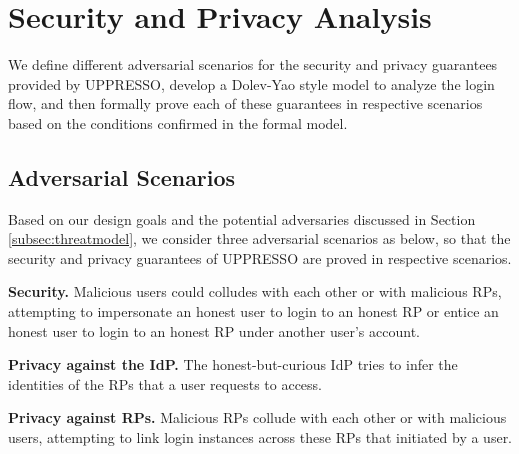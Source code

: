 \section{Security and Privacy Analysis}
\label{sec:analysis}
We define different adversarial scenarios for the security and privacy guarantees provided by UPPRESSO,
    develop a  Dolev-Yao style model to analyze the login flow,
    and then formally prove each of these guarantees in respective scenarios based on the conditions confirmed in the formal model.

\subsection{Adversarial Scenarios}

Based on our design goals and the potential adversaries discussed in Section \ref{subsec:threatmodel},
we consider three adversarial scenarios as below,
    so that the security and privacy guarantees of UPPRESSO are proved in respective scenarios.

\noindent\textbf{Security.}
Malicious users could colludes with each other or with malicious RPs,
    attempting to impersonate an honest user to login to an honest RP or entice an honest user to login to an honest RP under another user's account.

\noindent\textbf{Privacy against the IdP.}
The honest-but-curious IdP tries to infer the identities of the RPs that a user requests to access.

\noindent\textbf{Privacy against RPs.}
Malicious RPs collude with each other or with malicious users,
 attempting to link login instances across these RPs that initiated by a user.



